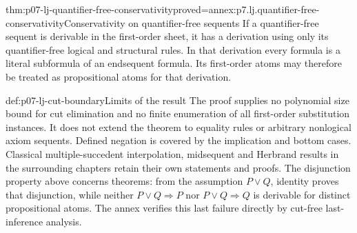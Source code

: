 \begin{hbcorollary}{thm:p07-lj-quantifier-free-conservativity}{proved=annex:p7.lj.quantifier-free-conservativity}{Conservativity on quantifier-free sequents}
If a quantifier-free sequent is derivable in the first-order sheet, it
has a derivation using only its quantifier-free logical and structural
rules.  In that derivation every formula is a literal subformula of an
endsequent formula.  Its first-order atoms may therefore be treated as
propositional atoms for that derivation.
\end{hbcorollary}

\begin{proofboundary}{def:p07-lj-cut-boundary}{Limits of the result}
The proof supplies no polynomial size bound for cut elimination and no
finite enumeration of all first-order substitution instances.  It does
not extend the theorem to equality rules or arbitrary nonlogical axiom
sequents.  Defined negation is covered by the implication and bottom
cases.  Classical multiple-succedent interpolation, midsequent and
Herbrand results in the surrounding chapters retain their own statements
and proofs.  The disjunction property above concerns theorems: from the
assumption \(P\lor Q\), identity proves that disjunction, while neither
\(P\lor Q\Rightarrow P\) nor \(P\lor Q\Rightarrow Q\) is derivable
for distinct propositional atoms.  The annex verifies this last failure
directly by cut-free last-inference analysis.
\end{proofboundary}
